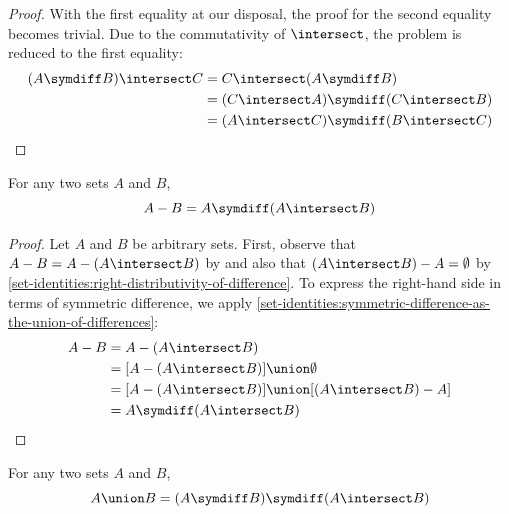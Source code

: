 \begin{proof}
    \vspace{0.5cm}
    \noindent
    With the first equality at our disposal, the proof for the second equality becomes trivial.
    Due to the commutativity of \( \intersect \), the problem is reduced to the first equality:
    \begin{align*}
        \mleft( A \symdiff B \mright) \intersect C
        &=
        C \intersect \mleft( A \symdiff B \mright)\\
        &=
        \mleft( C \intersect A \mright) \symdiff \mleft( C \intersect B \mright) \\
        &=
        \mleft( A \intersect C \mright) \symdiff \mleft( B \intersect C \mright) \qedhere
    \end{align*}
\end{proof}

\begin{thm}
    \label{set-identities:set-difference-in-terms-of-symmetric-difference-and-intersection}
    For any two sets \( A \) and \( B \),
    \begin{equation*}
        A - B = A \symdiff \mleft( A \intersect B \mright)
    \end{equation*}
\end{thm}

\begin{proof}
    Let \( A \) and \( B \) be arbitrary sets. First, observe that \( A - B = A - \mleft( A \intersect B \mright) \)
    by  and also that
    \( \mleft( A \intersect B \mright) - A = \emptyset \) by \cref{set-identities:right-distributivity-of-difference}.
    To express the right-hand side in terms of symmetric difference, we apply \cref{set-identities:symmetric-difference-as-the-union-of-differences}:
    \begin{align*}
        A - B
        &= A - \mleft( A \intersect B \mright)\\
        &= \mleft[ A - \mleft( A \intersect B \mright) \mright] \union \emptyset\\
        &= \mleft[ A - \mleft( A \intersect B \mright) \mright] \union \mleft[ \mleft( A \intersect B \mright) - A \mright]\\
        &= A \symdiff \mleft( A \intersect B \mright) \qedhere
    \end{align*}
\end{proof}

\begin{thm}
    \label{set-identities:union-in-terms-of-symmetric-difference-and-intersection}
    For any two sets \( A \) and \( B \),
    \begin{equation*}
        A \union B = \mleft( A \symdiff B \mright) \symdiff \mleft( A \intersect B \mright)
    \end{equation*}
\end{thm}

